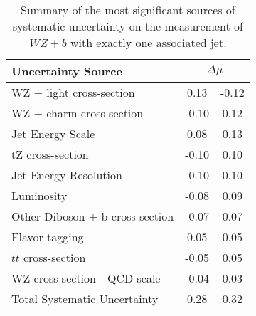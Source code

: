 \begin{table}[H]
    \centering
    \begin{tabular}{l|cc}
        \hline\hline
        Uncertainty Source & \multicolumn{2}{c}{$\Delta \mu$ }  \\
        \hline
        WZ + light cross-section & 0.13 & -0.12 \\
        WZ + charm cross-section & -0.10 & 0.12 \\
        Jet Energy Scale & 0.08 & 0.13 \\
        tZ cross-section & -0.10 & 0.10 \\
        Jet Energy Resolution & -0.10 & 0.10 \\
        Luminosity & -0.08 & 0.09 \\
        Other Diboson + b cross-section & -0.07 & 0.07 \\
        Flavor tagging & 0.05 & 0.05 \\
        $t\bar{t}$ cross-section & -0.05 & 0.05 \\
        WZ cross-section - QCD scale & -0.04 & 0.03 \\
        \hline
        Total Systematic Uncertainty & 0.28 & 0.32 \\
        
        \hline\hline
    \end{tabular}
    \caption{Summary of the most significant sources of systematic uncertainty on the measurement of $WZ+b$ with exactly one associated jet.}
    \label{tab:systematics_1j}
\end{table}

